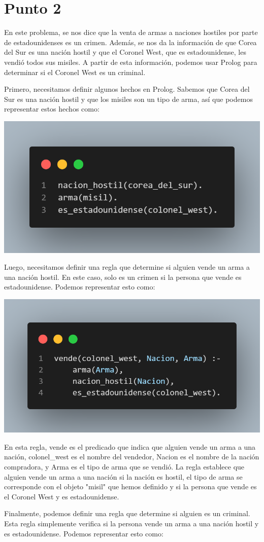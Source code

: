 \documentclass{article}
\begin{document}
\section*{Punto 2}
En este problema, se nos dice que la venta de armas a naciones hostiles por parte de estadounidenses es un crimen. Además, se nos da la información de que Corea del Sur es una nación hostil y que el Coronel West, que es estadounidense, les vendió todos sus misiles. A partir de esta información, podemos usar Prolog para determinar si el Coronel West es un criminal.

Primero, necesitamos definir algunos hechos en Prolog. Sabemos que Corea del Sur es una nación hostil y que los misiles son un tipo de arma, así que podemos representar estos hechos como:

\includegraphics[width=0.5\linewidth]{./img/code.png}

Luego, necesitamos definir una regla que determine si alguien vende un arma a una nación hostil. En este caso, solo es un crimen si la persona que vende es estadounidense. Podemos representar esto como:

\includegraphics[width=0.5\linewidth]{./img/code1.png}

En esta regla, vende es el predicado que indica que alguien vende un arma a una nación, colonel\_west es el nombre del vendedor, Nacion es el nombre de la nación compradora, y Arma es el tipo de arma que se vendió. La regla establece que alguien vende un arma a una nación si la nación es hostil, el tipo de arma se corresponde con el objeto "misil" que hemos definido y si la persona que vende es el Coronel West y es estadounidense.

Finalmente, podemos definir una regla que determine si alguien es un criminal. Esta regla simplemente verifica si la persona vende un arma a una nación hostil y es estadounidense. Podemos representar esto como:
\end{document}
